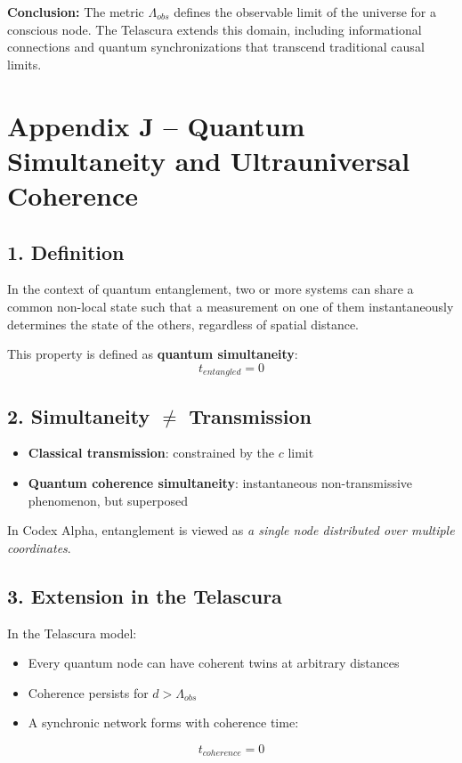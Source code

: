 \documentclass[12pt]{article}
\begin{document}
\textbf{Conclusion:} The metric $\Lambda_{obs}$ defines the observable limit of the universe for a conscious node.\newline
The Telascura extends this domain, including informational connections and quantum synchronizations that transcend traditional causal limits.

\section*{Appendix J – Quantum Simultaneity and Ultrauniversal Coherence}

\subsection*{1. Definition}
In the context of quantum entanglement, two or more systems can share a common non-local state such that a measurement on one of them instantaneously determines the state of the others, regardless of spatial distance.

This property is defined as \textbf{quantum simultaneity}:
\begin{equation}
    t_{entangled} = 0
\end{equation}

\subsection*{2. Simultaneity $\neq$ Transmission}
\begin{itemize}
    \item \textbf{Classical transmission}: constrained by the $c$ limit
    \item \textbf{Quantum coherence simultaneity}: instantaneous non-transmissive phenomenon, but superposed
\end{itemize}
In Codex Alpha, entanglement is viewed as \textit{a single node distributed over multiple coordinates}.

\subsection*{3. Extension in the Telascura}
In the Telascura model:
\begin{itemize}
    \item Every quantum node can have coherent twins at arbitrary distances
    \item Coherence persists for $d > \Lambda_{obs}$
    \item A synchronic network forms with coherence time:
\end{itemize}
\begin{equation}
    t_{coherence} = 0
\end{equation}
\end{document}

